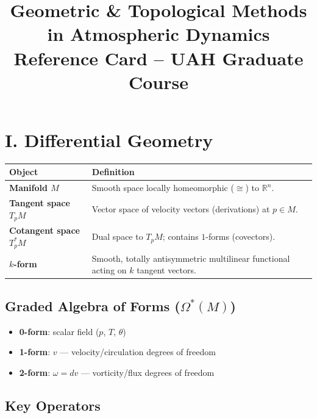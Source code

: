 \documentclass[11pt]{article}
\title{Geometric \& Topological Methods in Atmospheric Dynamics\\
\large Reference Card -- UAH Graduate Course}
\date{}
\begin{document}
\maketitle

\section*{I. Differential Geometry}

\begin{longtable}{>{\bfseries}p{}p{}}
Object & Definition\\
\midrule
Manifold $M$ &
Smooth space locally homeomorphic ($\cong$) to $\mathbb{R}^n$.\\

Tangent space $T_pM$ &
Vector space of velocity vectors (derivations) at $p\in M$.\\

Cotangent space $T_p^*M$ &
Dual space to $T_pM$; contains $1$-forms (covectors).\\

$k$-form &
Smooth, totally antisymmetric multilinear functional acting on $k$ tangent vectors.
\end{longtable}

\subsection*{Graded Algebra of Forms ($\Omega^*(M)$)}

\begin{itemize}[leftmargin=1.5cm]
\item \textbf{0-form}: scalar field ($p$, $T$, $\theta$)
\item \textbf{1-form}: $v$ --- velocity/circulation degrees of freedom
\item \textbf{2-form}: $\omega=dv$ --- vorticity/flux degrees of freedom
\end{itemize}

\subsection*{Key Operators}
\end{document}
